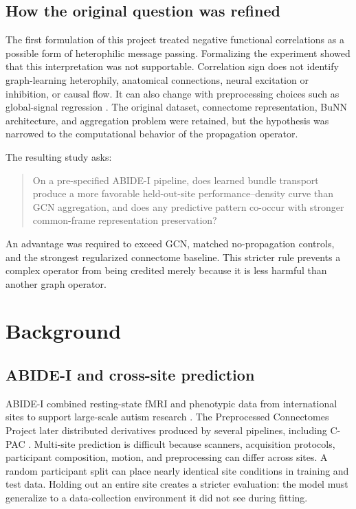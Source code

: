 \documentclass[11pt,a4paper]{article}
\begin{document}
\subsection{How the original question was refined}

The first formulation of this project treated negative functional
correlations as a possible form of heterophilic message passing. Formalizing
the experiment showed that this interpretation was not supportable.
Correlation sign does not identify graph-learning heterophily, anatomical
connections, neural excitation or inhibition, or causal flow. It can also
change with preprocessing choices such as global-signal regression
\cite{murphy2017global}. The original dataset, connectome representation, BuNN
architecture, and aggregation problem were retained, but the hypothesis was
narrowed to the computational behavior of the propagation operator.

The resulting study asks:

\begin{quote}
On a pre-specified ABIDE-I pipeline, does learned bundle transport produce a
more favorable held-out-site performance--density curve than GCN aggregation,
and does any predictive pattern co-occur with stronger common-frame
representation preservation?
\end{quote}

An advantage was required to exceed GCN, matched no-propagation controls, and
the strongest regularized connectome baseline. This stricter rule prevents a
complex operator from being credited merely because it is less harmful than
another graph operator.

\section{Background}

\subsection{ABIDE-I and cross-site prediction}

ABIDE-I combined resting-state fMRI and phenotypic data from international
sites to support large-scale autism research \cite{dimartino2014abide}. The
Preprocessed Connectomes Project later distributed derivatives produced by
several pipelines, including C-PAC \cite{abidepcp}. Multi-site prediction is
difficult because scanners, acquisition protocols, participant composition,
motion, and preprocessing can differ across sites. A random participant split
can place nearly identical site conditions in training and test data. Holding
out an entire site creates a stricter evaluation: the model must generalize to
a data-collection environment it did not see during fitting.
\end{document}
